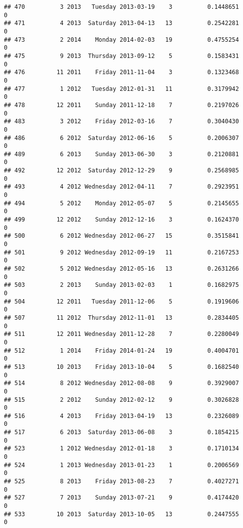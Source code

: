 \documentclass[
]{article}
\begin{document}
\begin{verbatim}
## 470          3 2013   Tuesday 2013-03-19    3          0.1448651             0
## 471          4 2013  Saturday 2013-04-13   13          0.2542281             0
## 473          2 2014    Monday 2014-02-03   19          0.4755254             0
## 475          9 2013  Thursday 2013-09-12    5          0.1583431             0
## 476         11 2011    Friday 2011-11-04    3          0.1323468             0
## 477          1 2012   Tuesday 2012-01-31   11          0.3179942             0
## 478         12 2011    Sunday 2011-12-18    7          0.2197026             0
## 483          3 2012    Friday 2012-03-16    7          0.3040430             0
## 486          6 2012  Saturday 2012-06-16    5          0.2006307             0
## 489          6 2013    Sunday 2013-06-30    3          0.2120881             0
## 492         12 2012  Saturday 2012-12-29    9          0.2568985             0
## 493          4 2012 Wednesday 2012-04-11    7          0.2923951             0
## 494          5 2012    Monday 2012-05-07    5          0.2145655             0
## 499         12 2012    Sunday 2012-12-16    3          0.1624370             0
## 500          6 2012 Wednesday 2012-06-27   15          0.3515841             0
## 501          9 2012 Wednesday 2012-09-19   11          0.2167253             0
## 502          5 2012 Wednesday 2012-05-16   13          0.2631266             0
## 503          2 2013    Sunday 2013-02-03    1          0.1682975             0
## 504         12 2011   Tuesday 2011-12-06    5          0.1919606             0
## 507         11 2012  Thursday 2012-11-01   13          0.2834405             0
## 511         12 2011 Wednesday 2011-12-28    7          0.2280049             0
## 512          1 2014    Friday 2014-01-24   19          0.4004701             0
## 513         10 2013    Friday 2013-10-04    5          0.1682540             0
## 514          8 2012 Wednesday 2012-08-08    9          0.3929007             0
## 515          2 2012    Sunday 2012-02-12    9          0.3026828             0
## 516          4 2013    Friday 2013-04-19   13          0.2326089             0
## 517          6 2013  Saturday 2013-06-08    3          0.1854215             0
## 523          1 2012 Wednesday 2012-01-18    3          0.1710134             0
## 524          1 2013 Wednesday 2013-01-23    1          0.2006569             0
## 525          8 2013    Friday 2013-08-23    7          0.4027271             0
## 527          7 2013    Sunday 2013-07-21    9          0.4174420             0
## 533         10 2013  Saturday 2013-10-05   13          0.2447555             0

\end{verbatim}
\end{document}
